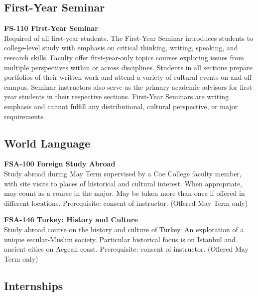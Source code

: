 \documentclass[
  letterpaper,
]{scrbook}
\begin{document}
\subsection{First-Year Seminar}\label{sec-academic-programs-fys}

\textbf{FS-110 First-Year Seminar}\\
Required of all first-year students. The First-Year Seminar introduces
students to college-level study with emphasis on critical thinking,
writing, speaking, and research skills. Faculty offer first-year-only
topics courses exploring issues from multiple perspectives within or
across disciplines. Students in all sections prepare portfolios of their
written work and attend a variety of cultural events on and off campus.
Seminar instructors also serve as the primary academic advisors for
first-year students in their respective sections. First-Year Seminars
are writing emphasis and cannot fulfill any distributional, cultural
perspective, or major requirements.

\subsection{World Language}\label{sec-academic-programs-world-language}

\textbf{FSA-100 Foreign Study Abroad}\\
Study abroad during May Term supervised by a Coe College faculty member,
with site visits to places of historical and cultural interest. When
appropriate, may count as a course in the major. May be taken more than
once if offered in different locations. Prerequisite: consent of
instructor. (Offered May Term only)

\textbf{FSA-146 Turkey: History and Culture}\\
Study abroad course on the history and culture of Turkey. An exploration
of a unique secular-Muslim society. Particular historical focus is on
Istanbul and ancient cities on Aegean coast. Prerequisite: consent of
instructor. (Offered May Term only)

\subsection{Internships}\label{sec-academic-programs-internships}
\end{document}
